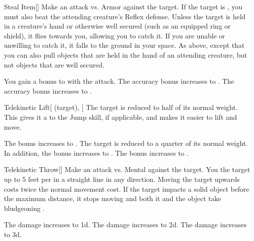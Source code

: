\lowercase{\hypertarget{spell:Steal Item}{}}\label{spell:Steal Item}
\begin{freeability}[Rank 1]{\hypertarget{spell:Steal Item}{Steal Item}}[]
Make an attack vs. Armor against the target.
If the target is , you must also beat the attending creature's Reflex defense.
\hit Unless the target is held in a creature's hand or otherwise well secured (such as an equipped ring or shield), it flies towards you, allowing you to catch it.
If you are unable or unwilling to catch it, it falls to the ground in your space.
\crit As above, except that you can also pull objects that are held in the hand of an attending creature, but not objects that are well secured.

\rankline
{} You gain a  bonus to  with the attack.
 The accuracy bonus increases to .
 The accuracy bonus increases to .
\end{freeability}
\vspace{0.25em}



\lowercase{\hypertarget{spell:Telekinetic Lift}{}}\label{spell:Telekinetic Lift}
\begin{attuneability}[Rank 1]{\hypertarget{spell:Telekinetic Lift}{Telekinetic Lift}}[ (target), ]
The target is reduced to half of its normal weight.
This gives it a   to the Jump skill, if applicable, and makes it easier to lift and move.

\rankline
{} The bonus increases to .
 The target is reduced to a quarter of its normal weight. In addition, the bonus increases to .
 The bonus increases to .
\end{attuneability}
\vspace{0.25em}



\lowercase{\hypertarget{spell:Telekinetic Throw}{}}\label{spell:Telekinetic Throw}
\begin{freeability}[Rank 1]{\hypertarget{spell:Telekinetic Throw}{Telekinetic Throw}}[]
Make an attack vs. Mental against the target.
\hit You  the target up to 5 feet per  in a straight line in any direction.
Moving the target upwards costs twice the normal movement cost.
If the target impacts a solid object before the maximum distance, it stops moving and both it and the object take bludgeoning .

\rankline
{} The damage increases to  \plus1d.
 The damage increases to  \plus2d.
 The damage increases to  \plus3d.
\end{freeability}
\vspace{0.25em}



